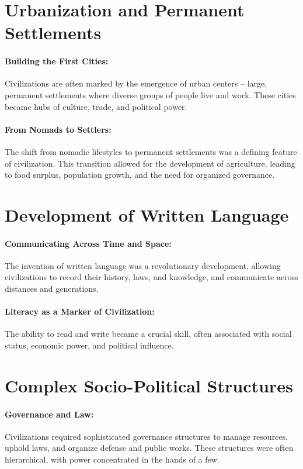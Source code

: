 \documentclass[a4paper,12pt]{book}
\begin{document}
\section*{Urbanization and Permanent Settlements}

\paragraph{Building the First Cities:}
Civilizations are often marked by the emergence of urban centers – large, permanent settlements where diverse groups of people live and work. These cities became hubs of culture, trade, and political power.

\paragraph{From Nomads to Settlers:}
The shift from nomadic lifestyles to permanent settlements was a defining feature of civilization. This transition allowed for the development of agriculture, leading to food surplus, population growth, and the need for organized governance.

\section*{Development of Written Language}

\paragraph{Communicating Across Time and Space:}
The invention of written language was a revolutionary development, allowing civilizations to record their history, laws, and knowledge, and communicate across distances and generations.

\paragraph{Literacy as a Marker of Civilization:}
The ability to read and write became a crucial skill, often associated with social status, economic power, and political influence.

\section*{Complex Socio-Political Structures}

\paragraph{Governance and Law:}
Civilizations required sophisticated governance structures to manage resources, uphold laws, and organize defense and public works. These structures were often hierarchical, with power concentrated in the hands of a few.
\end{document}
